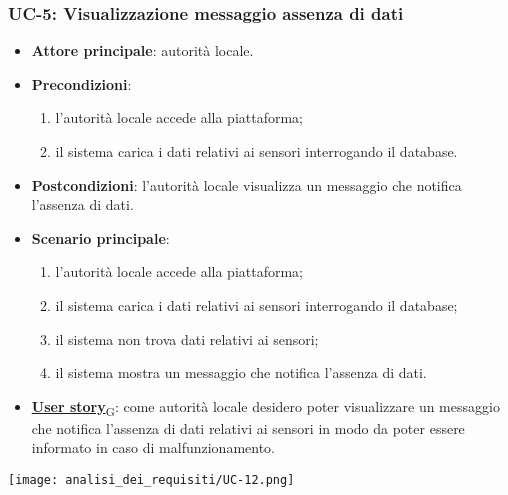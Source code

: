 
\subsubsection{UC-5: Visualizzazione messaggio assenza di dati}
\begin{itemize}
	\item \textbf{Attore principale}: autorità locale.
	\item \textbf{Precondizioni}:
	      \begin{enumerate}
		      \item l'autorità locale accede alla piattaforma;
		      \item il sistema carica i dati relativi ai sensori interrogando il database.
	      \end{enumerate}
	\item \textbf{Postcondizioni}: l'autorità locale visualizza un messaggio che notifica l'assenza di dati.
	\item \textbf{Scenario principale}:
	      \begin{enumerate}
		      \item l'autorità locale accede alla piattaforma;
		      \item il sistema carica i dati relativi ai sensori interrogando il database;
		      \item il sistema non trova dati relativi ai sensori;
		      \item il sistema mostra un messaggio che notifica l'assenza di dati.
	      \end{enumerate}
	\item \href{https://7last.github.io/docs/rtb/documentazione-interna/glossario\#user-story}{\textbf{User story}\textsubscript{G}}:
	      come autorità locale desidero poter visualizzare un messaggio che notifica l'assenza di dati relativi ai sensori
	      in modo da poter essere informato in caso di malfunzionamento.
\end{itemize}
\begin{center}
	\texttt{[image: analisi\_dei\_requisiti/UC-12.png]}
\end{center}

